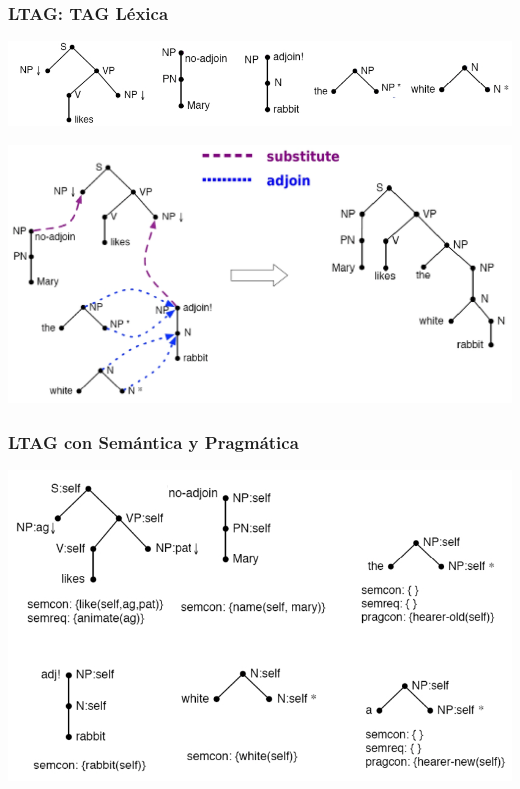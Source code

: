 \documentclass[compress,color=usenames]{beamer}
\begin{document}
\begin{frame}
\frametitle{LTAG: TAG L\'exica} 

\begin{center}
\includegraphics[scale=.4]{pics/pic3-1.jpg} \pause
\medskip

\includegraphics[scale=.3]{pics/pic3-2.jpg} 
\end{center}

\end{frame}

\begin{frame}
\frametitle{LTAG con Sem\'antica y Pragm\'atica}

\begin{center}
\includegraphics[scale=.4]{pics/pic3-3.jpg}
\end{center}
\end{frame}
\end{document}
